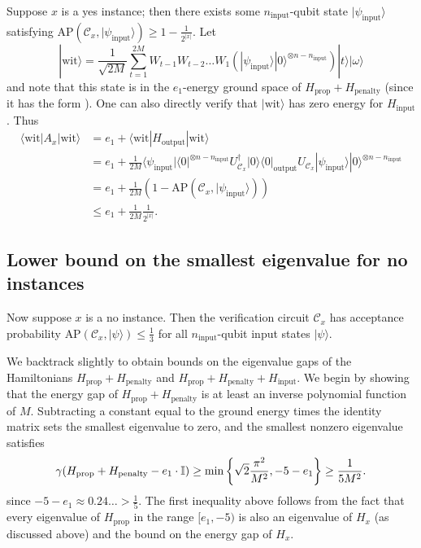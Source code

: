 \documentclass[../thesis-main/thesis-main]{subfiles}
\begin{document}
Suppose $x$ is a yes instance; then there exists some $n_{\text{input}}$-qubit state $|\psi_{\text{input}}\rangle$ satisfying $\text{AP}\left(\mathcal{C}_{x},|\psi_{\text{input}}\rangle\right)\geq1-\frac{1}{2^{|x|}}$. Let
\begin{equation}
|\text{wit}\rangle=\frac{1}{\sqrt{2M}}\sum_{t=1}^{2M}W_{t-1}W_{t-2}\ldots W_{1}\left(|\psi_{\text{input}}\rangle|0\rangle^{\otimes n-n_{\text{input}}}\right)|t\rangle|\omega\rangle
\end{equation}
and note that this state is in the $e_{1}$-energy ground space of
$H_{\text{prop}}+H_{\text{penalty}}$ (since it has the form ).
One can also directly verify that $|\text{wit}\rangle$ has zero energy for $H_{\text{input}}$. Thus
\begin{align*}
\langle\text{wit}|A_{x}|\text{wit}\rangle & =e_{1}+\langle\text{wit}|H_{\text{output}}|\text{wit}\rangle\\
 & =e_{1}+\frac{1}{2M}\langle\psi_{\text{input}}|\langle0|^{\otimes n-n_{\text{input}}}U_{\mathcal{C}_{x}}^{\dagger}|0\rangle\langle0|_{\text{output}}U_{\mathcal{C}_{x}}|\psi_{\text{input}}\rangle|0\rangle^{\otimes n-n_{\text{input}}}\\
 & =e_{1}+\frac{1}{2M}\left(1-\text{AP}(\mathcal{C}_{x},|\psi_{\text{input}}\rangle)\right)\\
 & \leq e_{1}+\frac{1}{2M}\frac{1}{2^{|x|}}.
\end{align*}


\subsection{Lower bound on the smallest eigenvalue for no instances}
\label{sec:mappingno}

Now suppose $x$ is a no instance. Then the verification circuit $\mathcal{C}_{x}$ has acceptance probability $\text{AP}\left(\mathcal{C}_{x},|\psi\rangle\right)\leq\frac{1}{3}$ for all $n_{\text{input}}$-qubit input states $|\psi\rangle$.

We backtrack slightly to obtain bounds on the eigenvalue gaps of the Hamiltonians $H_{\text{prop}}+H_{\text{penalty}}$ and $H_{\text{prop}}+H_{\text{penalty}}+H_{\text{input}}$. We begin by showing that the energy gap of $H_{\text{prop}}+H_{\text{penalty}}$ is at least an inverse polynomial function of $M$. Subtracting a constant equal to the ground energy times the identity matrix sets the smallest eigenvalue to zero, and the smallest nonzero eigenvalue satisfies 
\begin{equation}
\gamma(H_{\text{prop}}+H_{\text{penalty}}-e_{1}\cdot\mathbb{I})\geq\min\left\{ \sqrt{2}\frac{\pi^{2}}{M^{2}},-5-e_{1}\right\} \geq\frac{1}{5M^{2}}.\label{eq:gamma_Ha}
\end{equation}
since $-5-e_{1}\approx0.24\ldots>\frac{1}{5}$. The first inequality above follows from the fact that every eigenvalue of $H_{\text{prop}}$ in the range $[e_{1},-5)$ is also an eigenvalue of $H_{x}$ (as discussed above) and the bound  on the energy gap of $H_{x}$.
\end{document}
